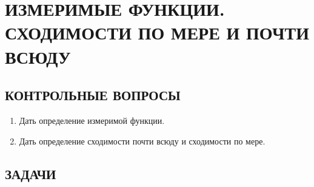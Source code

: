 \documentclass[12pt,a4paper]{article}
\begin{document}
\section{ИЗМЕРИМЫЕ ФУНКЦИИ. СХОДИМОСТИ ПО МЕРЕ И ПОЧТИ ВСЮДУ}

\subsection*{КОНТРОЛЬНЫЕ ВОПРОСЫ}
\begin{enumerate}
\item Дать определение измеримой функции.
\item Дать определение сходимости почти всюду и сходимости по мере.
\end{enumerate}

\subsection*{ЗАДАЧИ}
\end{document}

